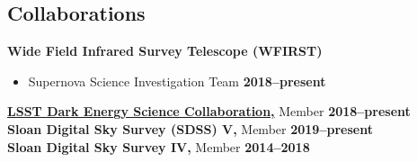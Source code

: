 \documentclass[margin]{res}
\begin{document}
\begin{resume}






\section{Collaborations}
{\bf Wide Field Infrared Survey Telescope (WFIRST)}
\begin{itemize}\itemsep -2pt
 \item[] Supernova Science Investigation Team \hfill {\bf 2018--present}
\end{itemize} \vspace{-12pt}
{\bf \href{http://www.lsst-desc.org}{LSST Dark Energy Science Collaboration,}} Member \hfill {\bf 2018--present}\\
{\bf Sloan Digital Sky Survey (SDSS) V,} Member \hfill {\bf 2019--present}\\
{\bf Sloan Digital Sky Survey IV,} Member \hfill {\bf 2014--2018}










\end{resume}
\end{document}
